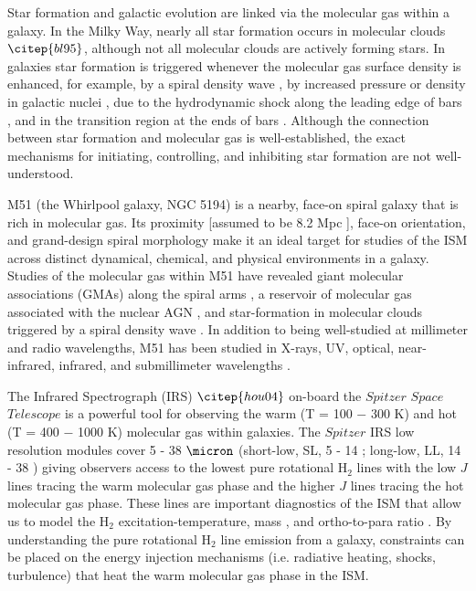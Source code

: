 \documentclass[manuscript]{aastex}
\begin{document}
Star formation and galactic evolution are linked via the molecular gas within a galaxy.  In the Milky Way, nearly all star formation occurs in molecular clouds $\citep{bl95}$, although not all molecular clouds are actively forming stars.  In galaxies star formation is triggered whenever the molecular gas surface density is enhanced, for example, by a spiral density wave \citep{vog88}, by increased pressure or density in galactic nuclei \citep{you91, she05}, due to the hydrodynamic shock along the leading edge of bars \citep{she00, she02}, and in the transition region at the ends of bars \citep{kl91}.  Although the connection between star formation and molecular gas is well-established, the exact mechanisms for initiating, controlling, and inhibiting star formation are not well-understood.

M51 (the Whirlpool galaxy, NGC 5194) is a nearby, face-on spiral galaxy that is rich in molecular gas.  Its proximity [assumed to be 8.2 Mpc \citep{tul88}], face-on orientation, and grand-design spiral morphology make it an ideal target for studies of the ISM across distinct dynamical, chemical, and physical environments in a galaxy.  Studies of the molecular gas within M51 have revealed giant molecular associations (GMAs) along the spiral arms \citep{aal99}, a reservoir of molecular gas associated with the nuclear AGN \citep{sco98}, and star-formation in molecular clouds triggered by a spiral density wave \citep{vog88}.  In addition to being well-studied at millimeter and radio wavelengths, M51 has been studied in X-rays, UV, optical, near-infrared, infrared,  and submillimeter wavelengths \citep{pal85, ter01, sco01, cal05, mat04}.  

The Infrared Spectrograph (IRS) $\citep{hou04}$ on-board the $Spitzer$ $Space$ $Telescope$ is a powerful tool for observing the warm (T = 100 $-$ 300 K) and hot (T = 400 $-$ 1000 K) molecular gas within galaxies.  The $Spitzer$ IRS low resolution modules cover 5 - 38 $\micron$ (short-low, SL, 5 - 14 \micron; long-low, LL, 14 - 38 \micron) giving observers access to the lowest pure rotational $\mathrm{H_2}$ lines with the low $J$ lines tracing the warm molecular gas phase and the higher $J$ lines tracing the hot molecular gas phase.  These lines are important diagnostics of the ISM that allow us to  model the $\mathrm{H_2}$ excitation-temperature, mass \citep{rig02, hig06}, and ortho-to-para ratio \citep{neu98, neu06}.  By understanding the pure rotational $\mathrm{H_2}$ line emission from a galaxy, constraints can be placed on the energy injection mechanisms (i.e. radiative heating, shocks, turbulence) that heat the warm molecular gas phase in the ISM.  
\end{document}
